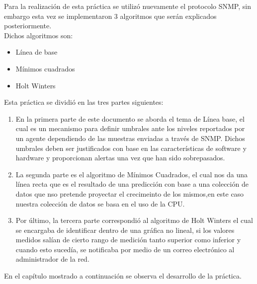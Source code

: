 Para la realización de esta práctica se utilizó nuevamente el protocolo SNMP, sin embargo esta vez se implementaron 3 algoritmos que serán explicados posteriormente.\\
Dichos algoritmos son:
\begin{itemize}
\item Línea de base
\item Mínimos cuadrados
\item Holt Winters
\end{itemize} 

Esta práctica se dividió en las tres partes siguientes:
\begin{enumerate}
\item En la primera parte de este documento se aborda el tema de Línea base, el cual es un mecanismo para definir umbrales ante los niveles reportados por un agente dependiendo de las muestras enviadas a través de SNMP. Dichos umbrales deben ser justificados con base en las características de software y hardware y proporcionan alertas una vez que han sido sobrepasados.
\item La segunda parte es el algoritmo de Mínimos Cuadrados, el cual nos da una línea recta que es el resultado de una predicción con base a una colección de datos que nso pretende proyectar el crecimeinto de los mismos,en este caso nuestra colección de datos se basa en el uso de la CPU.
\item Por último, la tercera parte correspondió al algoritmo de Holt Winters el cual se encargaba de identificar dentro de una gráfica no lineal, si los valores medidos salían de cierto rango de medición tanto superior como inferior y cuando esto sucedía, se notificaba por medio de un correo electrónico al administrador de la red.
\end{enumerate}

En el capítulo mostrado a continuación se observa el desarrollo de la práctica.



 